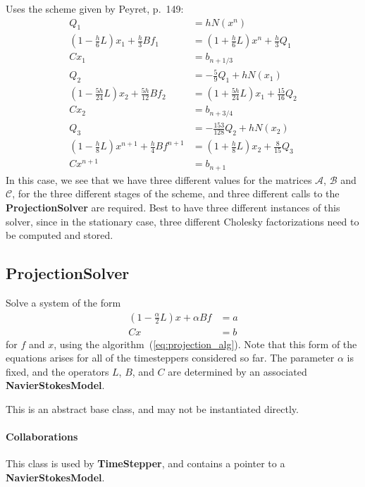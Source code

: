 \documentclass[11pt]{article}
\def\class#1{{\bf #1}} %
\begin{document}
Uses the scheme given by Peyret, p.~149\cite{Peyret:2002}:
\begin{align}
	Q_1 &= hN(x^n)\\
	(1-\frac{h}{6}L)x_1 + \frac{h}{3}Bf_1 &= (1+\frac{h}{6}L)x^n + \frac{h}{3}Q_1\\
	Cx_1 &= b_{n+1/3}\\
	Q_2 &= -\frac{5}{9} Q_1 + hN(x_1)\\
	(1-\frac{5h}{24}L)x_2 + \frac{5h}{12}Bf_2 &= (1+\frac{5h}{24}L)x_1 + \frac{15}{16}Q_2\\
	Cx_2 &= b_{n+3/4}\\
	Q_3 &= -\frac{153}{128} Q_2 + hN(x_2)\\
	(1-\frac{h}{8}L)x^{n+1} + \frac{h}{4}Bf^{n+1} &= (1+\frac{h}{8}L)x_2 + \frac{8}{15}Q_3\\
	Cx^{n+1} &= b_{n+1}
\end{align}
In this case, we see that we have three different values for the matrices $\mathcal{A}$, $\mathcal{B}$ and $\mathcal{C}$, for the three different stages of the scheme, and three different calls to the \class{ProjectionSolver} are required.  Best to have three different instances of this solver, since in the stationary case, three different Cholesky factorizations need to be computed and stored.

\subsection{ProjectionSolver}
Solve a system of the form
\begin{equation}
\begin{aligned}
	(1 - \frac{\alpha}{2}L)x + \alpha Bf &= a\\
	Cx &= b
\end{aligned}
\label{eq:projection_specific}
\end{equation}
for $f$ and $x$, using the algorithm~(\ref{eq:projection_alg}).  Note that this form of the equations arises for all of the timesteppers considered so far.  The parameter $\alpha$ is fixed, and the operators $L$, $B$, and $C$ are determined by an associated \class{NavierStokesModel}.

This is an abstract base class, and may not be instantiated directly.

\paragraph{Collaborations}
This class is used by \class{TimeStepper}, and contains a pointer to a \class{NavierStokesModel}.
\end{document}
